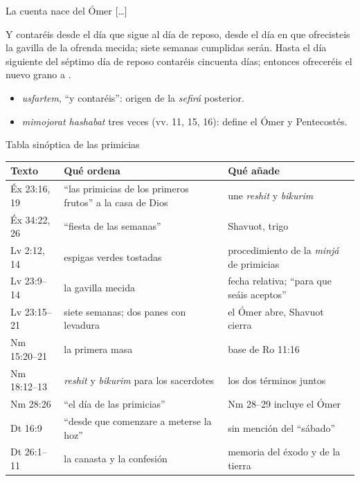 \begin{frame}{La cuenta nace del Ómer}
\centering{} \foreignlanguage{spanish}{[\ldots]} 
\begin{cita}Y contaréis desde el día que sigue al día de reposo, desde el día en que ofrecisteis la gavilla de la ofrenda mecida; siete semanas cumplidas serán. Hasta el día siguiente del séptimo día de reposo contaréis cincuenta días; entonces ofreceréis el nuevo grano a \SENOR.\end{cita}
\small\RaggedRight
\begin{itemize}
\item \emph{usfartem}, ``y contaréis'': origen de la \emph{sefirá} posterior.
\item \emph{mimojorat hashabat} tres veces (vv. 11, 15, 16): define  el Ómer y Pentecostés.
\end{itemize}
\end{frame}

\begin{frame}{Tabla sinóptica de las primicias}
\scriptsize\renewcommand{\arraystretch}{1.08}
\begin{tabular}{@{}L{2.0cm}L{4.6cm}L{5.3cm}@{}}
\toprule
\textbf{Texto} & \textbf{Qué ordena} & \textbf{Qué añade} \\ \midrule
Éx 23:16, 19 & ``las primicias de los primeros frutos'' a la casa de Dios & une \emph{reshit} y \emph{bikurim} \\
Éx 34:22, 26 & ``fiesta de las semanas'' & Shavuot, trigo \\
Lv 2:12, 14 & espigas verdes tostadas & procedimiento de la \emph{minjá} de primicias \\
Lv 23:9--14 & la gavilla mecida & fecha relativa; ``para que seáis aceptos'' \\
Lv 23:15--21 & siete semanas; dos panes con levadura & el Ómer abre, Shavuot cierra \\
Nm 15:20--21 & la primera masa & base de Ro 11:16 \\
Nm 18:12--13 & \emph{reshit} y \emph{bikurim} para los sacerdotes & los dos términos juntos \\
Nm 28:26 & ``el día de las primicias'' & Nm 28--29  incluye el Ómer \\
Dt 16:9 & ``desde que comenzare a meterse la hoz'' & sin mención del ``sábado'' \\
Dt 26:1--11 & la canasta y la confesión & memoria del éxodo y de la tierra \\
\bottomrule
\end{tabular}
\end{frame}

